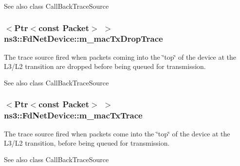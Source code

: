 \begin{DoxySeeAlso}{See also}
class Call\+Back\+Trace\+Source 
\end{DoxySeeAlso}
\subsubsection[{\texorpdfstring{m\+\_\+mac\+Tx\+Drop\+Trace}{m_macTxDropTrace}}]{$<${\bf Ptr}$<$const {\bf Packet}$>$ $>$ ns3\+::\+Fd\+Net\+Device\+::m\+\_\+mac\+Tx\+Drop\+Trace\hspace{0.3cm}{\ttfamily [private]}}\hypertarget{classns3_1_1FdNetDevice_ad204b6948cb00479cc229465c6c07ebb}{}\label{classns3_1_1FdNetDevice_ad204b6948cb00479cc229465c6c07ebb}
The trace source fired when packets coming into the \char`\"{}top\char`\"{} of the device at the L3/\+L2 transition are dropped before being queued for transmission.

\begin{DoxySeeAlso}{See also}
class Call\+Back\+Trace\+Source 
\end{DoxySeeAlso}
\subsubsection[{\texorpdfstring{m\+\_\+mac\+Tx\+Trace}{m_macTxTrace}}]{$<${\bf Ptr}$<$const {\bf Packet}$>$ $>$ ns3\+::\+Fd\+Net\+Device\+::m\+\_\+mac\+Tx\+Trace\hspace{0.3cm}{\ttfamily [private]}}\hypertarget{classns3_1_1FdNetDevice_a7a067bc7ab39f2ebfcc925a58da4f519}{}\label{classns3_1_1FdNetDevice_a7a067bc7ab39f2ebfcc925a58da4f519}
The trace source fired when packets come into the \char`\"{}top\char`\"{} of the device at the L3/\+L2 transition, before being queued for transmission.

\begin{DoxySeeAlso}{See also}
class Call\+Back\+Trace\+Source 
\end{DoxySeeAlso}
